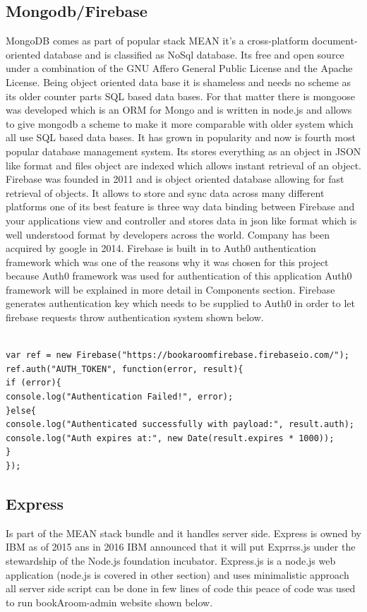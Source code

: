 \subsection{Mongodb/Firebase}
\bigbreak
MongoDB comes as part of popular stack MEAN it’s a cross-platform document-oriented database and is classified as NoSql database. Its free and open source under a combination of the GNU Affero General Public License and the Apache License. Being object oriented data base it is shameless and needs no scheme as its older counter parts SQL based data bases. For that matter there is mongoose was developed which is an ORM for Mongo and is written in node.js and allows to give mongodb a scheme to make it more comparable with older system which all use SQL based data bases. It has grown in popularity and now is fourth most popular database management system. Its stores everything as an object in JSON like format and files object are indexed which allows instant retrieval of an object. 
\\
\bigbreak
Firebase was founded in 2011 and is object oriented database allowing for fast retrieval of objects. It allows to store and sync data across many different platforms one of its best feature is three way data binding between Firebase and your applications view and controller and stores data in json like format which is well understood format by developers across the world. Company has been acquired by google in 2014. Firebase is built in to Auth0 authentication framework which was one of the reasons why it was chosen for this project because Auth0 framework was used for authentication of this application Auth0 framework will be explained in more detail in Components section. Firebase generates authentication key which needs to be supplied to Auth0 in order to let firebase requests throw authentication system shown below.
\begin{verbatim}

var ref = new Firebase("https://bookaroomfirebase.firebaseio.com/");
ref.auth("AUTH_TOKEN", function(error, result){
if (error){
console.log("Authentication Failed!", error);
}else{
console.log("Authenticated successfully with payload:", result.auth);
console.log("Auth expires at:", new Date(result.expires * 1000));
}
});

\end{verbatim}


\subsection{Express}
\bigbreak
Is part of the MEAN stack bundle and it handles server side. Express is owned by IBM as of 2015 ans in 2016 IBM announced that it will put Exprrss.js under the stewardship of the Node.js foundation incubator.
\bigbreak
Express.js is a node.js web application (node.js is covered in other section) and uses minimalistic approach all server side script can be done in few lines of code this peace of code was used to run bookAroom-admin website shown below.

